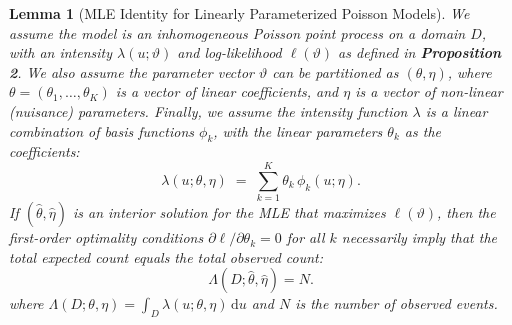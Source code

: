 \documentclass[extra,mreferee]{gji}
\theoremstyle{lemma}
\newtheorem{lemma}{Lemma}
\begin{document}
\begin{lemma}[MLE Identity for Linearly Parameterized Poisson Models]
We assume the model is an inhomogeneous Poisson point process on a domain $D$, with an intensity $\lambda(u; \vartheta)$ and log-likelihood $\ell(\vartheta)$ as defined in \textbf{Proposition 2}. We also assume the parameter vector $\vartheta$ can be partitioned as $(\theta, \eta)$, where $\theta = (\theta_1, \dots, \theta_K)$ is a vector of linear coefficients, and $\eta$ is a vector of non-linear (nuisance) parameters. Finally, we assume the intensity function $\lambda$ is a linear combination of basis functions $\phi_k$, with the linear parameters $\theta_k$ as the coefficients:
\[
\lambda(u;\theta,\eta)\;=\;\sum_{k=1}^{K}\theta_k\,\phi_k(u;\eta).
\]
If $(\hat\theta, \hat\eta)$ is an interior solution for the MLE that maximizes $\ell(\vartheta)$, then the first-order optimality conditions $\partial \ell / \partial \theta_k = 0$ for all $k$ necessarily imply that the total expected count equals the total observed count:
\[
\boxed{\;\Lambda(D;\hat\theta,\hat\eta)=N.\;}
\]
where $\Lambda(D;\theta,\eta) = \int_D \lambda(u;\theta,\eta)\,\mathrm{d}u$ and $N$ is the number of observed events.
\end{lemma}
\end{document}
